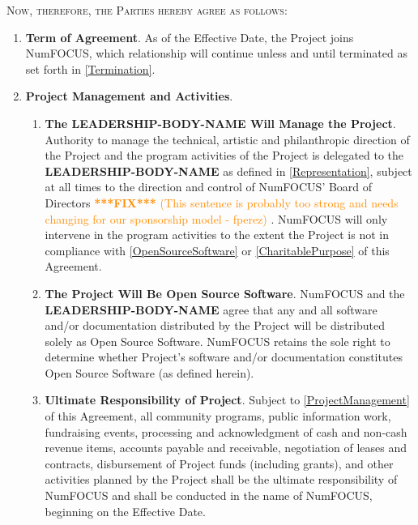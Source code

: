 \documentclass[letterpaper,12pt]{article}
\newcommand{\fix}[1]{
  \textcolor{darkorange} { \textbf{***FIX***} #1 } }
\newcommand{\leadershipbody}{\textbf{LEADERSHIP-BODY-NAME}}
\begin{document}
\medskip{}

\textsc{Now, therefore, the Parties hereby agree as follows:}

\begin{enumerate}[label=\arabic*.,ref=\S~\arabic*]
\item \textbf{Term of Agreement}. As of the Effective Date, the Project
joins NumFOCUS, which relationship will continue unless and until
terminated as set forth in \ref{Termination}. 
\item \textbf{Project Management and Activities}.


\begin{enumerate}[label=\alph*.,ref=\theenumi(\alph*)]

\item \textbf{The \leadershipbody{} Will Manage the
  Project}. \label{ProjectManagement} Authority to manage the technical,
  artistic and philanthropic direction of the Project and the program
  activities of the Project is delegated to the \leadershipbody{} as defined in
  \ref{Representation}, subject at all times to the direction and control of
  NumFOCUS' Board of Directors \fix{(This sentence is probably too strong and
    needs changing for our sponsorship model - fperez)}. NumFOCUS will only intervene in the program
  activities to the extent the Project is not in compliance with
  \ref{OpenSourceSoftware} or \ref{CharitablePurpose} of this Agreement.
  
\item \textbf{The Project Will Be Open Source
  Software}. \label{OpenSourceSoftware} NumFOCUS and the \leadershipbody{}
  agree that any and all software and/or documentation distributed by the
  Project will be distributed solely as Open Source Software.  NumFOCUS retains
  the sole right to determine whether Project's software and/or documentation
  constitutes Open Source Software (as defined herein).
  
\item \textbf{Ultimate Responsibility of Project}. Subject to
  \ref{ProjectManagement} of this Agreement, all community programs, public
  information work, fundraising events, processing and acknowledgment of cash
  and non-cash revenue items, accounts payable and receivable, negotiation of
  leases and contracts, disbursement of Project funds (including grants), and
  other activities planned by the Project shall be the ultimate responsibility
  of NumFOCUS and shall be conducted in the name of NumFOCUS, beginning on the
  Effective Date.
  

\end{enumerate}
\end{enumerate}
\end{document}
